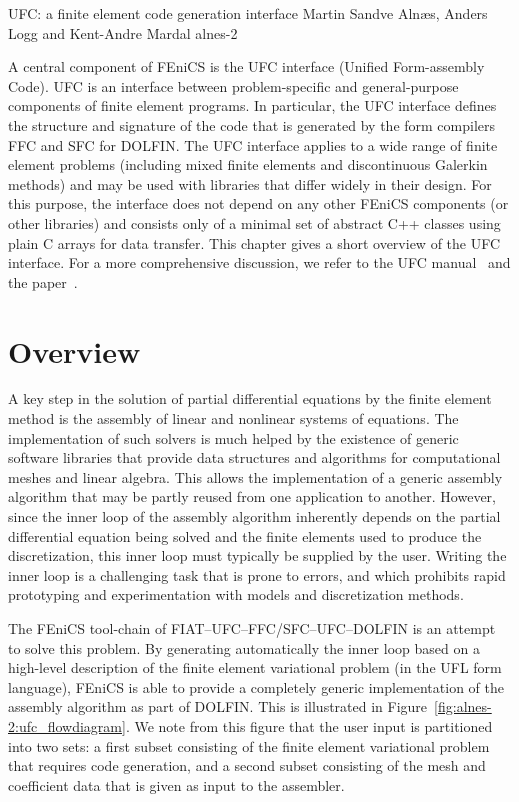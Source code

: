               {UFC: a finite element code generation interface}
              {Martin Sandve Aln\ae{}s, Anders Logg and Kent-Andre Mardal}
              {alnes-2}

A central component of FEniCS is the UFC interface (Unified
Form-assembly Code). UFC is an interface between problem-specific and
general-purpose components of finite element programs. In particular,
the UFC interface defines the structure and signature of the code that
is generated by the form compilers FFC and SFC for DOLFIN.
The UFC interface applies to a wide range of finite element problems
(including mixed finite elements and discontinuous Galerkin methods)
and may be used with libraries that differ widely in their design. For
this purpose, the interface does not depend on any other FEniCS
components (or other libraries) and consists only of a minimal set of
abstract C++ classes using plain C arrays for data transfer.
This chapter gives a short overview of the UFC interface. For a more
comprehensive discussion, we refer to the UFC
manual~\citep{AlnaesLangtangenEtAl2007} and the
paper~\citet{AlnaesLoggMardalEtAl2009}.

\section{Overview}
\label{sec:alnes-2overview}

A key step in the solution of partial differential equations by the
finite element method is the assembly of linear and nonlinear systems
of equations. The implementation of such solvers is much helped by the
existence of generic software libraries that provide data structures
and algorithms for computational meshes and linear algebra. This
allows the implementation of a generic assembly algorithm that may be
partly reused from one application to another. However, since the
inner loop of the assembly algorithm inherently depends on the partial
differential equation being solved and the finite elements used to
produce the discretization, this inner loop must typically be supplied
by the user. Writing the inner loop is a challenging task that is
prone to errors, and which prohibits rapid prototyping and
experimentation with models and discretization methods.

The FEniCS tool-chain of FIAT--UFC--FFC/SFC--UFC--DOLFIN is an attempt
to solve this problem. By generating automatically the inner loop
based on a high-level description of the finite element variational
problem (in the UFL form language), FEniCS is able to provide a
completely generic implementation of the assembly algorithm as part of
DOLFIN. This is illustrated in
Figure~\ref{fig:alnes-2:ufc_flowdiagram}. We note from this figure
that the user input is partitioned into two sets: a first subset
consisting of the finite element variational problem that requires
code generation, and a second subset consisting of the mesh and
coefficient data that is given as input to the assembler.


